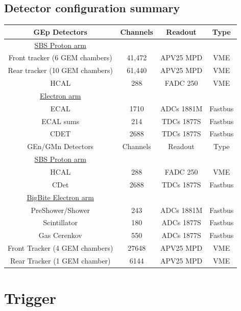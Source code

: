 \documentclass[]{article}
\begin{document}
 
 
 
 \subsection{Detector configuration summary}
 \begin{tabular}{|c|c|c|c|}
 	\hline
 	GEp Detectors & Channels& Readout & Type \\
 	\hline
 	\underline{SBS Proton arm} & & & \\
 	Front tracker (6 GEM chambers) & 41,472 & APV25 MPD& VME\\
 	Rear tracker (10 GEM chambers) & 61,440& APV25 MPD& VME\\
 	HCAL & 288 & FADC 250 &VME\\
 	\hline
 	\underline{Electron arm} & & & \\
 	ECAL & 1710 & ADCs 1881M &Fastbus\\
 	ECAL sums& 214 & TDCs 1877S &Fastbus\\
 	CDET & 2688 & TDCs 1877S &Fastbus \\
 	\hline
 	\hline
 	GEn/GMn Detectors & Channels& Readout & Type \\
 	\hline
 	\underline{SBS Proton arm} & & & \\
 	HCAL & 288 & FADC 250 &VME\\
 	CDet & 2688 & TDCs 1877S&Fastbus\\
 	\hline
 	\underline{BigBite Electron arm} & & & \\
 	PreShower/Shower & 243 & ADCs 1881M&Fastbus\\
 	Scintillator & 180& ADCs 1877S&Fastbus\\
 	Gas Cerenkov & 550& ADCs 1877S&Fastbus\\
 	Front Tracker (4 GEM chambers) & 27648 & APV25 MPD &VME\\
 	Rear Tracker (1 GEM chamber) & 6144& APV25 MPD &VME\\
 	\hline
 \end{tabular}
 
 \section{Trigger}
\end{document}
